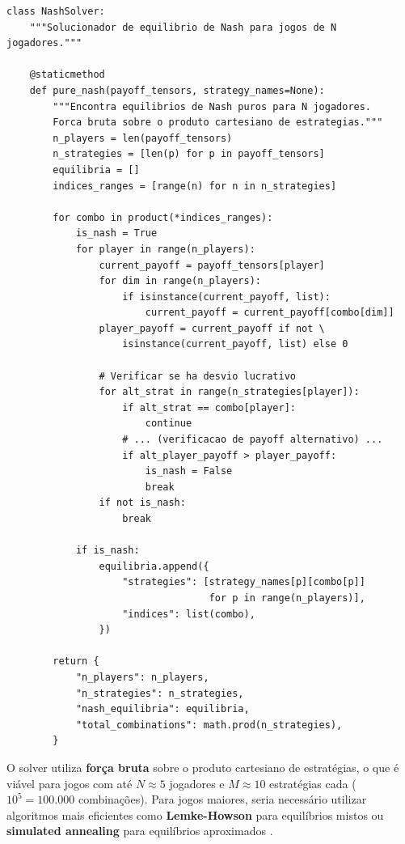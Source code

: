 \begin{verbatim}
class NashSolver:
    """Solucionador de equilibrio de Nash para jogos de N jogadores."""

    @staticmethod
    def pure_nash(payoff_tensors, strategy_names=None):
        """Encontra equilibrios de Nash puros para N jogadores.
        Forca bruta sobre o produto cartesiano de estrategias."""
        n_players = len(payoff_tensors)
        n_strategies = [len(p) for p in payoff_tensors]
        equilibria = []
        indices_ranges = [range(n) for n in n_strategies]

        for combo in product(*indices_ranges):
            is_nash = True
            for player in range(n_players):
                current_payoff = payoff_tensors[player]
                for dim in range(n_players):
                    if isinstance(current_payoff, list):
                        current_payoff = current_payoff[combo[dim]]
                player_payoff = current_payoff if not \
                    isinstance(current_payoff, list) else 0

                # Verificar se ha desvio lucrativo
                for alt_strat in range(n_strategies[player]):
                    if alt_strat == combo[player]:
                        continue
                    # ... (verificacao de payoff alternativo) ...
                    if alt_player_payoff > player_payoff:
                        is_nash = False
                        break
                if not is_nash:
                    break

            if is_nash:
                equilibria.append({
                    "strategies": [strategy_names[p][combo[p]]
                                   for p in range(n_players)],
                    "indices": list(combo),
                })

        return {
            "n_players": n_players,
            "n_strategies": n_strategies,
            "nash_equilibria": equilibria,
            "total_combinations": math.prod(n_strategies),
        }
\end{verbatim}

O solver utiliza \textbf{força bruta} sobre o produto cartesiano de estratégias, o que é viável para jogos com até $N \approx 5$ jogadores e $M \approx 10$ estratégias cada ($10^5 = 100.000$ combinações). Para jogos maiores, seria necessário utilizar algoritmos mais eficientes como \textbf{Lemke-Howson} para equilíbrios mistos ou \textbf{simulated annealing} para equilíbrios aproximados \cite{mckelvey1996computation}.


